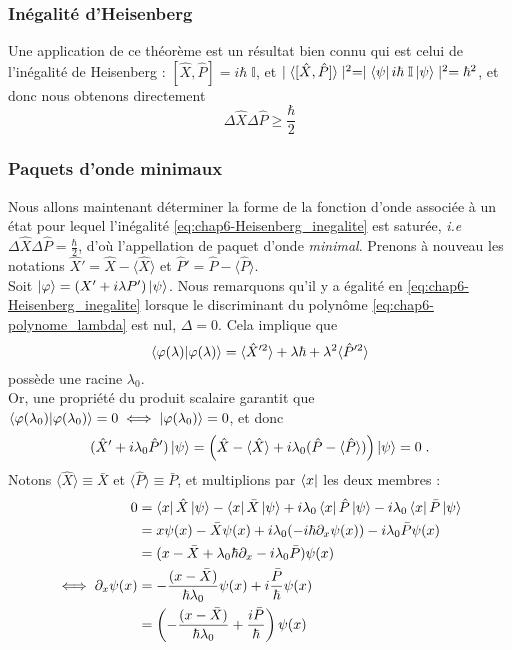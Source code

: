 \documentclass[../notesdecours]{subfiles}
\begin{document}
\subsubsection{Inégalité d'Heisenberg}
Une application de ce théorème est un résultat bien connu qui est celui de l'inégalité de Heisenberg : $[\hat{X}, \hat{P}] = i\hbar \; \mathbb{I}$, et $\mid \langle [\hat{X}, \hat{P}] \rangle \mid^2 = \mid \bra{\psi} i\hbar \;\mathbb{I} \ket{\psi} \mid^2 = \hbar^2$, et donc nous obtenons directement
\begin{equation}
    \Delta \hat{X} \Delta \hat{P} \geq \frac{\hbar}{2}
    \label{eq:chap6-Heisenberg_inegalite}
\end{equation}

\subsubsection{Paquets d'onde minimaux}
Nous allons maintenant déterminer la forme de la fonction d'onde associée à un état pour lequel l'inégalité \eqref{eq:chap6-Heisenberg_inegalite} est saturée, \textit{i.e} $\Delta \hat{X} \Delta \hat{P} = \frac{\hbar}{2}$, d'où l'appellation de paquet d'onde \textit{minimal}. Prenons à nouveau les notations $\hat{X}' = \hat{X} - \langle \hat{X} \rangle$ et $\hat{P}' = \hat{P} - \langle \hat{P} \rangle$. \\

Soit $\ket{\varphi} = (X' + i\lambda P') \ket{\psi}$. Nous remarquons qu'il y a égalité en \eqref{eq:chap6-Heisenberg_inegalite} lorsque le discriminant du polynôme \eqref{eq:chap6-polynome_lambda} est nul, $\Delta = 0$. Cela implique que $$\braket{\varphi(\lambda) | \varphi(\lambda)} =  \langle \hat{X}'^2 \rangle + \lambda \hbar + \lambda^2 \langle \hat{P}'^2 \rangle$$ possède une racine $\lambda_0$. \\

Or, une propriété du produit scalaire garantit que $\braket{\varphi(\lambda_0) | \varphi(\lambda_0)} = 0 \iff \ket{\varphi(\lambda_0)} =0$, et donc $$(\hat{X}' + i\lambda_0 \hat{P}')\ket{\psi} = \left( \hat{X} - \langle \hat{X} \rangle + i\lambda_0 (\hat{P} - \langle \hat{P} \rangle) \right) \ket{\psi} =0\; .$$
Notons $\langle \hat{X} \rangle \equiv \bar{X}$ et $\langle \hat{P} \rangle \equiv \bar{P}$, et multiplions par $\bra{x}$ les deux membres : \\
\begin{align}
    0&= \bra{x} \hat{X} \ket{\psi} - \bra{x} \bar{X} \ket{\psi} + i \lambda_0 \bra{x} \hat{P} \ket{\psi} - i\lambda_0 \bra{x} \bar{P} \ket{\psi} \notag \\
    &= x \psi(x) - \bar{X} \psi(x) + i\lambda_0(-i\hbar \partial_x \psi(x)) - i\lambda_0 \bar{P} \psi(x) \notag \\
    &= (x - \bar{X} + \lambda_0 \hbar \partial_x -i \lambda_0 \bar{P}) \psi(x) \notag \\
    \iff \partial_x \psi(x) &= - \frac{(x- \bar{X})}{\hbar \lambda_0} \psi(x) + i \frac{\bar{P}}{\hbar} \psi(x) \notag \\
    &= \left( -\frac{(x-\bar{X})}{\hbar \lambda_0} + \frac{i\bar{P}}{\hbar} \right) \psi(x) \label{eq:ua diff paquet minimal}
\end{align}
\end{document}
